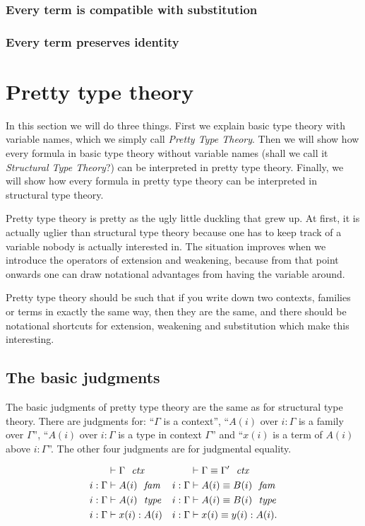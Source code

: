 \subsubsection{Every term is compatible with substitution}

\subsubsection{Every term preserves identity}


\section{Pretty type theory}
In this section we will do three things. First we explain basic type theory with
variable names, which we simply call \emph{Pretty Type Theory}. 
Then we will show how every formula in basic type theory without
variable names (shall we call it \emph{Structural Type Theory}?) 
can be interpreted in pretty type theory. Finally, we will show how every formula
in pretty type theory can be interpreted in structural type theory.

Pretty type theory is pretty as the ugly little duckling that grew up. At first, it is actually uglier than
structural type theory because one has to keep track of a variable nobody is
actually interested in. The situation improves when we introduce the operators
of extension and weakening, because from that point onwards one can draw notational
advantages from having the variable around.

Pretty type theory should be such that if you write down two contexts, families
or terms in exactly the same way, then they are the same, and there should be
notational shortcuts for extension, weakening and substitution which make
this interesting.

\subsection{The basic judgments}
The basic judgments of pretty type theory are the same as for structural type
theory. There are judgments for: ``$\Gamma$ is a context'',
``$A(i)$ over $i:\Gamma$ is a family over $\Gamma$'', ``$A(i)$ over $i:\Gamma$ 
is a type in context $\Gamma$''
and ``$x(i)$ is a term of $A(i)$ above $i:\Gamma$''. The other four
judgments are for judgmental equality. 

\begin{align*}
\jvctx*{\Gamma} & \jvctxeq*{\Gamma}{\Gamma'}\\
\jvfam*{i}{\Gamma}{A} & \jvfameq*{i}{\Gamma}{A}{B}\\
\jvtype*{i}{\Gamma}{A} & \jvtypeeq*{i}{\Gamma}{A}{B}\\
\jvterm*{i}{\Gamma}{A}{x} & \jvtermeq*{i}{\Gamma}{A}{x}{y}.
\end{align*}

